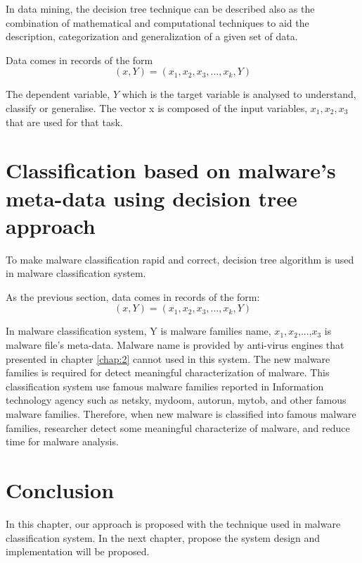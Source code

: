 In data mining, the decision tree technique can be described also as the combination of mathematical and computational techniques to aid the description, categorization and generalization of a given set of data.

Data comes in records of the form
\begin{equation}
    (x,Y) = (x_1, x_2, x_3, ..., x_k, Y) 
\end{equation}

The dependent variable, $Y$ which is the target variable is analysed to understand, classify or generalise. The vector x is composed of the input variables, $x_{1}, x_{2}, x_{3}$ that are used for that task.
\section{Classification based on malware's meta-data using decision tree approach}

To make malware classification rapid and correct, decision tree algorithm is used in malware classification system.

As the previous section, data comes in records of the form:\begin{equation}
    (x,Y) = (x_1, x_2, x_3, ..., x_k, Y) 
\end{equation}

In malware classification system, Y is malware families name, $x_{1}, x_{2}$,...,$x_{3}$ is malware file's meta-data. Malware name is provided by anti-virus engines that presented in chapter \ref{chap:2} cannot used in this system. The new malware families is required for detect meaningful characterization of malware. This classification system use famous malware families reported in Information technology agency such as netsky, mydoom, autorun, mytob, and other famous malware families. Therefore, when new malware is classified into famous malware families, researcher detect some meaningful characterize of malware, and reduce time for malware analysis. 
\section{Conclusion}
In this chapter, our approach is proposed with the technique used in malware classification system.
In the next chapter, propose the system design and implementation will be proposed.